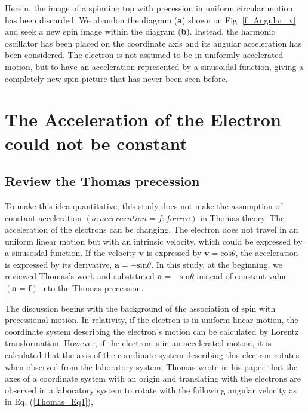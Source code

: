 \documentclass[%
 reprint,
 amsmath,amssymb,
 aps,
]{revtex4-1}
\numberwithin{equation}{section}%
\begin{document}
Herein, the image of a spinning top with precession in uniform circular motion has been discarded. We abandon the diagram ({\bf a}) shown on Fig. \ref{f_Angular_v} and seek a new spin image within the diagram ({\bf b}). Instead, the harmonic oscillator has been placed on the coordinate axis and its angular acceleration has been considered. The electron is not assumed to be in uniformly accelerated motion, but to have an acceleration represented by a sinusoidal function, giving a completely new spin picture that has never been seen before.


\section{The Acceleration of the Electron could not be constant}

\subsection{Review the Thomas precession}


To make this idea quantitative, this study does not make the assumption of constant acceleration $(a: acceraration = f: fource)$ in Thomas theory. The acceleration of the electrons can be changing. The electron does not travel in an uniform linear motion but with an intrinsic velocity, which could be expressed by a sinusoidal function. If the velocity ${\boldsymbol v}$ is expressed by ${\boldsymbol v} = \mathrm{cos}\theta$, the acceleration is expressed by its derivative, ${\boldsymbol a} = - \mathrm{sin}\theta$. In this study, at the beginning, we reviewed Thomas's work and substituted ${\boldsymbol a} = -\mathrm{sin}\theta$ instead of constant value $({\boldsymbol a} = {\boldsymbol f})$ into the Thomas precession. 


The discussion begins with the background of the association of spin with precessional motion. In relativity, if the electron is in uniform linear motion, the coordinate system describing the electron's motion can be calculated by Lorentz transformation. However, if the electron is in an accelerated motion, it is calculated that the axis of the coordinate system describing this electron rotates when observed from the laboratory system. Thomas wrote in his paper that the axes of a coordinate system with an origin and translating with the electrons are observed in a laboratory system to rotate with the following angular velocity as in Eq. (\ref{Thomas_Eq1}),
\end{document}
